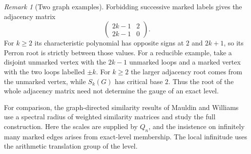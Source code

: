 \documentclass[11pt]{article}
\theoremstyle{definition}
\theoremstyle{remark}
\newtheorem{remark}[theorem]{Remark}
\begin{document}
\begin{remark}[Two graph examples]
Forbidding successive marked labels gives the adjacency matrix
\[
 \begin{pmatrix}2k-1&2\\2k-1&0\end{pmatrix}.
\]
For $k\ge2$ its characteristic polynomial has opposite signs at $2$
and $2k+1$, so its Perron root is strictly between those values.
For a reducible example, take a disjoint unmarked vertex with the
$2k-1$ unmarked loops and a marked vertex with the two loops labelled
$\pm k$. For $k\ge2$ the larger adjacency root comes from the unmarked
vertex, while $S_k(G)$ has critical base $2$. Thus the root of the
whole adjacency matrix need not determine the gauge of an exact level.
\end{remark}

For comparison, the graph-directed similarity results of Mauldin
and Williams \cite[Theorems~3 and~4]{MW} use a spectral radius of weighted
similarity matrices and study the full construction. Here the scales
are supplied by $Q_n$, and the insistence on infinitely many marked
edges arises from exact-level membership. The local infinitude uses
the arithmetic translation group of the level.
\end{document}
